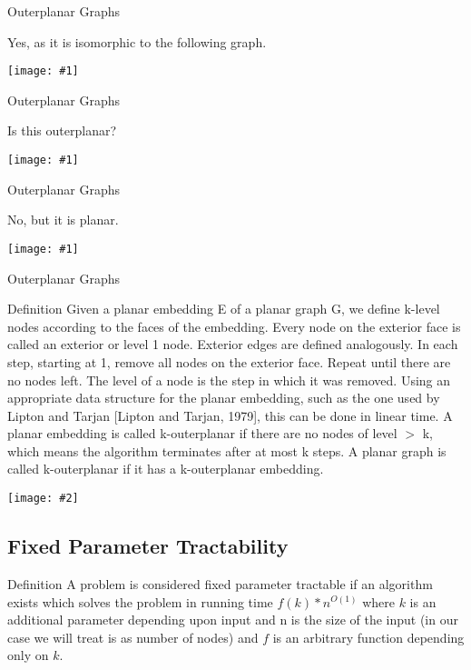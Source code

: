 \documentclass{beamer}
\newcommand{\iph}[2]{
    \texttt{[image: \#2]}
}
\newcommand{\ph}[1]{
    \texttt{[image: \#1]}
}
\begin{document}
\begin{frame}{Outerplanar Graphs}
\begin{example}
    Yes, as it is isomorphic to the following graph.

    \ph{o4}


\end{example}
\end{frame}


\begin{frame}{Outerplanar Graphs}
\begin{example}
    Is this outerplanar?

    \ph{o5}


\end{example}
\end{frame}


\begin{frame}{Outerplanar Graphs}
\begin{example}
    No, but it is planar.

    \ph{o6}


\end{example}
\end{frame}

\begin{frame}{Outerplanar Graphs}
\begin{block}{Definition}
    Given a planar embedding E of a planar graph G, we
    define k-level nodes according to the faces of the embedding. Every node on the exterior face is called an exterior
    or level 1 node. Exterior edges are defined analogously. In each
    step, starting at 1, remove all nodes on the exterior face.
    Repeat until there are no nodes left. The level of a node
    is the step in which it was removed. Using an appropriate data structure for the planar embedding, such as the
    one used by Lipton and Tarjan [Lipton and Tarjan,
    1979], this can be done in linear time.
    A planar embedding is called k-outerplanar if there are
    no nodes of level $>$ k, which means the algorithm terminates after at most k steps. A planar graph is called
    k-outerplanar if it has a k-outerplanar embedding. 
\end{block}
\end{frame}
\begin{frame}
    \begin{example}
        \iph{0.75}{o7}
    \end{example}
\end{frame}
\subsection{Fixed Parameter Tractability}
\begin{frame}
    \begin{block}{Definition}
        A problem is considered fixed parameter tractable if an algorithm exists which solves the problem in running time $f(k) * n^{O(1)}$ where $k$ is an additional parameter depending upon input and n is the size of the input (in our case we will treat is as number of nodes) and $f$ is an arbitrary function depending only on $k$.
    \end{block}

\end{frame}
\end{document}
